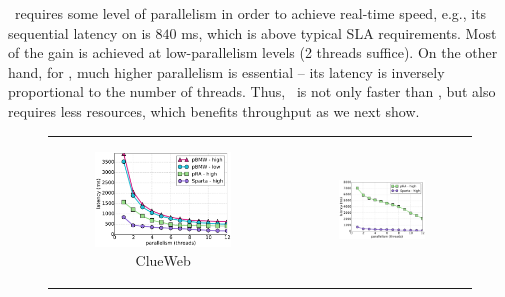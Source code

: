 \alg\ requires some level of parallelism in order to achieve real-time speed, e.g., its sequential
latency on \cw\/  is $840$ ms, which is  above typical SLA requirements. Most of the gain is achieved at low-parallelism levels (2 threads suffice). 
On the other hand, for \pBMW, much higher parallelism is essential -- its latency is inversely proportional to the number of threads. Thus, \alg\ is not only faster 
than \pBMW, but also requires less resources, which benefits throughput as we next show.

\begin{figure}[tbh]
\centering
\begin{tabular}{ccc}
      \begin{subfigure}[t]{0.3\textwidth}
         \includegraphics[width=\textwidth]{figures/latency_12terms_clueweb.pdf}
        \caption[]{ClueWeb}
      \end{subfigure} 
& 
	\hspace{0.1\textwidth}
& 
      \begin{subfigure}[t]{0.3\textwidth}
      \includegraphics[width=\textwidth]{figures/latency_12terms_cluewebX10.pdf}

\end{subfigure}
\end{tabular}
\end{figure}
